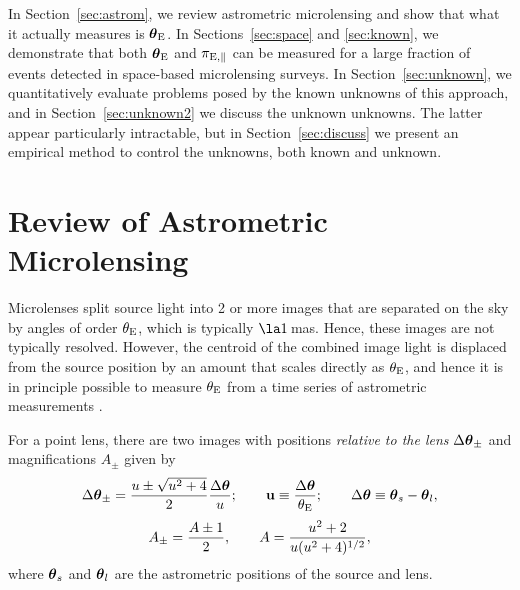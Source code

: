 \documentclass[12pt,preprint]{aastex}
\newcommand{\bdv}[1]{\mbox{\boldmath$#1$}}
\def\e{{\rm E}}
\def\btheta{{\bdv\theta}}
\begin{document}
In Section~\ref{sec:astrom}, we review astrometric microlensing and
show that what it actually measures is $\btheta_\e$.  
In Sections~\ref{sec:space} and \ref{sec:known}, we demonstrate that both 
$\btheta_\e$ and $\pi_{\e,\parallel}$ can be measured for a large fraction of events
detected in space-based microlensing surveys. In Section~\ref{sec:unknown},
we quantitatively evaluate problems posed by the known unknowns of this
approach, and in Section~\ref{sec:unknown2} we discuss the unknown unknowns.
The latter appear particularly intractable, but in  Section~\ref{sec:discuss}
we present an empirical method to control the 
unknowns, both known and unknown.

\section{{Review of Astrometric Microlensing}
\label{sec:astrom}}

Microlenses split source light into 2 or more images that are separated
on the sky by angles of order $\theta_\e$, which is typically $\la 1\,$mas.
Hence, these images are not typically resolved.  However, the centroid
of the combined image light is displaced from the source position by an
amount that scales directly as $\theta_\e$, and hence it is in principle
possible to measure $\theta_\e$ from a time series of astrometric measurements
\citep{my95,hnp95,walker95}.

For a point lens, there are two images with positions {\it relative to the lens}
$\Delta\btheta_\pm$ and magnifications $A_\pm$ given by \citep{einstein36}
\begin{equation}
\Delta\btheta_\pm = {u\pm\sqrt{u^2+4}\over 2}{\Delta\btheta\over u};
\qquad {\bf u}\equiv {\Delta\btheta\over \theta_\e};
\qquad \Delta\btheta \equiv \btheta_s - \btheta_l,
\label{eqn:thetapm}
\end{equation}
\begin{equation}
A_\pm = {A\pm 1\over 2},
\qquad A = {u^2+2\over u(u^2+4)^{1/2}},
\label{eqn:apm}
\end{equation}
where $\btheta_s$ and $\btheta_l$ are the astrometric positions of the source 
and lens.
\end{document}
